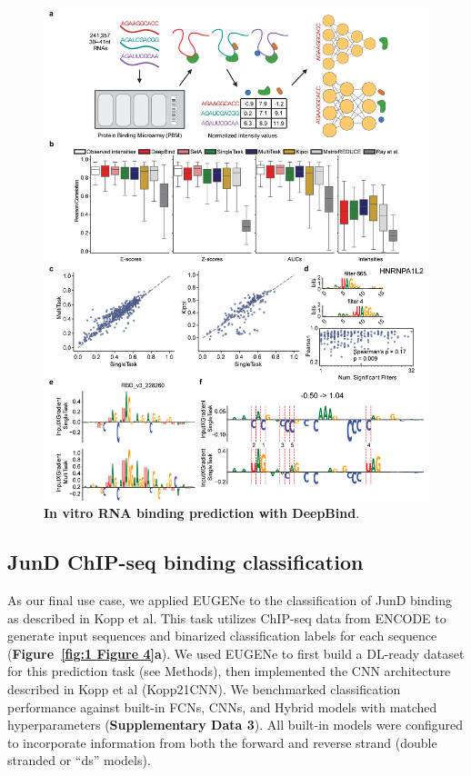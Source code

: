 \begin{figure}[!htbp]
    \centering
    \includegraphics[height=0.8\textheight, keepaspectratio]{1_figures-and-files/extended_data_figure1.png}
    \caption[In vitro RNA binding prediction with DeepBind]{\textbf{In vitro RNA binding prediction with DeepBind}.}
    \label{fig:1 Figure 3}
\end{figure}

\clearpage


\subsection{JunD ChIP-seq binding classification}

As our final use case, we applied EUGENe to the classification of JunD binding as described in Kopp et al\cite{Kopp2020-fw}. This task utilizes ChIP-seq data from ENCODE\cite{ENCODE_Project_Consortium2012-tn} to generate input sequences and binarized classification labels for each sequence (\textbf{Figure~\ref{fig:1 Figure 4}a}). We used EUGENe to first build a DL-ready dataset for this prediction task (see Methods), then implemented the CNN architecture described in Kopp et al (Kopp21CNN). We benchmarked classification performance against built-in FCNs, CNNs, and Hybrid models with matched hyperparameters (\textbf{Supplementary Data 3}). All built-in models were configured to incorporate information from both the forward and reverse strand (double stranded or “ds” models). 

